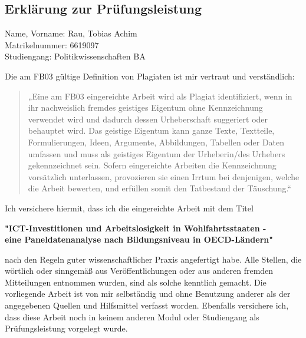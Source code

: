 
\subsection{Erklärung zur Prüfungsleistung}

Name, Vorname: Rau, Tobias Achim \\
Matrikelnummer: 6619097 \\
Studiengang: Politikwissenschaften BA

\vspace{0.5cm}

Die am FB03 gültige Definition von Plagiaten ist mir vertraut und verständlich: 

\begin{quote}
    „Eine am FB03 eingereichte Arbeit wird als Plagiat identifiziert, wenn in ihr nachweislich 
    fremdes geistiges Eigentum ohne Kennzeichnung verwendet wird und dadurch dessen Urheberschaft 
    suggeriert oder behauptet wird. Das geistige Eigentum kann ganze Texte, Textteile, 
    Formulierungen, Ideen, Argumente, Abbildungen, Tabellen oder Daten umfassen und muss als 
    geistiges Eigentum der Urheberin/des Urhebers gekennzeichnet sein. Sofern eingereichte 
    Arbeiten die Kennzeichnung vorsätzlich unterlassen, provozieren sie einen Irrtum bei 
    denjenigen, welche die Arbeit bewerten, und erfüllen somit den Tatbestand der Täuschung.“
\end{quote}

Ich versichere hiermit, dass ich die eingereichte Arbeit mit dem Titel 

\begin{center}
    \textbf{"\ac{ICT}-Investitionen und Arbeitslosigkeit in Wohlfahrtsstaaten - \\ 
    eine Paneldatenanalyse nach Bildungsniveau in OECD-Ländern"} \\ 
\end{center}

nach den Regeln guter wissenschaftlicher Praxis angefertigt habe. Alle Stellen, die wörtlich oder 
sinngemäß aus Veröffentlichungen oder aus anderen fremden Mitteilungen entnommen wurden, sind als 
solche kenntlich gemacht. Die vorliegende Arbeit ist von mir selbständig und ohne Benutzung 
anderer als der angegebenen Quellen und Hilfsmittel verfasst worden. Ebenfalls versichere ich, 
dass diese Arbeit noch in keinem anderen Modul oder Studiengang als Prüfungsleistung vorgelegt 
wurde.

